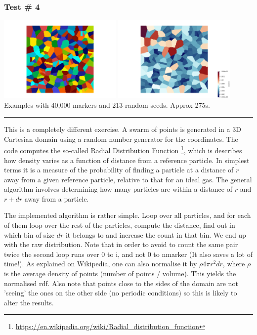 \subsubsection*{Test \# 4}

\begin{center}
\includegraphics[width=6cm]{python_codes/fieldstone_125/results/test4a}
\includegraphics[width=6cm]{python_codes/fieldstone_125/results/test4b}\\
{\captionfont Examples with 40,000 markers and 213 random seeds. Approx 275s. }
\end{center}

\noindent\rule{\textwidth}{1pt}

This is a completely different exercise. A swarm of points is generated in a 3D Cartesian 
domain using a random number generator for the coordinates.
The code computes the so-called Radial Distribution Function
\footnote{\url{https://en.wikipedia.org/wiki/Radial_distribution_function}}, 
which is describes how density varies as a function of distance from a reference particle. 
In simplest terms it is a measure of the probability of finding a particle at a distance of $r$ 
away from a given reference particle, relative to that for an ideal gas. 
The general algorithm involves determining how many particles are within a distance of $r$ and $r+dr$ away from a particle. 

The implemented algorithm is rather simple. Loop over all particles, and for each of them 
loop over the rest of the particles, compute the distance, find out in which bin of size $dr$ it belongs 
to and increase the count in that bin. We end up with the raw distribution.
Note that in order to avoid to count the same pair twice the second loop 
runs over 0 to i, and not 0 to nmarker (It also saves a lot of time!).
As explained on Wikipedia, one can also normalise it by $\rho 4\pi r^2 dr$, where $\rho$ is
the average density of points (number of points / volume). This yields the 
normalised rdf. 
Also note that points close to the sides of the domain are not 'seeing' the ones 
on the other side (no periodic conditions) so this is likely to alter the results.

